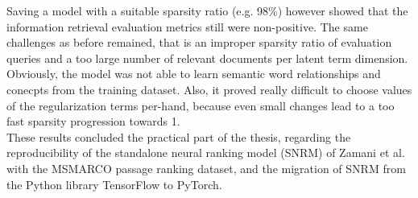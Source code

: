 Saving a model with a suitable sparsity ratio (e.g. 98\%) however showed that the information retrieval
    evaluation metrics still were non-positive.
The same challenges as before remained, that is an improper sparsity ratio of evaluation queries and 
    a too large number of relevant documents per latent term dimension.
    Obviously, the model was not able to learn semantic word relationships and conecpts 
    from the training dataset.
Also, it proved really difficult to choose values of the regularization terms per-hand, because 
    even small changes lead to a too fast sparsity progression towards 1.\\
These results concluded the practical part of the thesis, regarding the reproducibility of the 
    standalone neural ranking model (SNRM) of
    Zamani et al. \cite{zamani:2018:from-neural-reranking-to-neural-ranking}
    with the MSMARCO passage ranking dataset, 
    and the migration of SNRM from the Python library TensorFlow to PyTorch.
